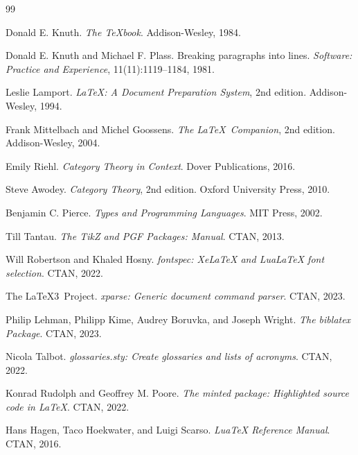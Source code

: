 
\begin{thebibliography}{99}

Donald E. Knuth.
\emph{The \TeX book}.
Addison-Wesley, 1984.

Donald E. Knuth and Michael F. Plass.
Breaking paragraphs into lines.
\emph{Software: Practice and Experience}, 11(11):1119--1184, 1981.

Leslie Lamport.
\emph{\LaTeX: A Document Preparation System}, 2nd edition.
Addison-Wesley, 1994.

Frank Mittelbach and Michel Goossens.
\emph{The \LaTeX\ Companion}, 2nd edition.
Addison-Wesley, 2004.

Emily Riehl.
\emph{Category Theory in Context}.
Dover Publications, 2016.

Steve Awodey.
\emph{Category Theory}, 2nd edition.
Oxford University Press, 2010.

Benjamin C. Pierce.
\emph{Types and Programming Languages}.
MIT Press, 2002.

Till Tantau.
\emph{The TikZ and PGF Packages: Manual}.
CTAN, 2013.

Will Robertson and Khaled Hosny.
\emph{fontspec: XeLaTeX and LuaLaTeX font selection}.
CTAN, 2022.

The \LaTeX3\ Project.
\emph{xparse: Generic document command parser}.
CTAN, 2023.

Philip Lehman, Philipp Kime, Audrey Boruvka, and Joseph Wright.
\emph{The biblatex Package}.
CTAN, 2023.

Nicola Talbot.
\emph{glossaries.sty: Create glossaries and lists of acronyms}.
CTAN, 2022.

Konrad Rudolph and Geoffrey M. Poore.
\emph{The minted package: Highlighted source code in \LaTeX}.
CTAN, 2022.

Hans Hagen, Taco Hoekwater, and Luigi Scarso.
\emph{LuaTeX Reference Manual}.
CTAN, 2016.

\end{thebibliography}
